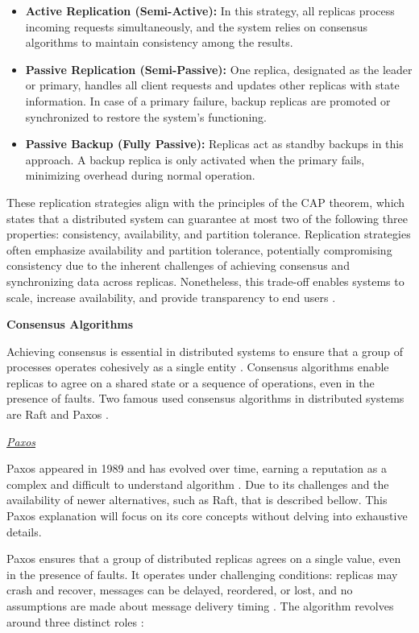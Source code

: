 \begin{itemize}
    \item	\textbf{Active Replication (Semi-Active):} In this strategy, all replicas process incoming requests simultaneously, and the system relies on consensus algorithms to maintain consistency among the results.
    \item	\textbf{Passive Replication (Semi-Passive):} One replica, designated as the leader or primary, handles all client requests and updates other replicas with state information. In case of a primary failure, backup replicas are promoted or synchronized to restore the system’s functioning.
    \item	\textbf{Passive Backup (Fully Passive):} Replicas act as standby backups in this approach. A backup replica is only activated when the primary fails, minimizing overhead during normal operation.
\end{itemize}

These replication strategies align with the principles of the CAP theorem, which states that a distributed system can guarantee at most two of the following three properties: consistency, availability, and partition tolerance. Replication strategies often emphasize availability and partition tolerance, potentially compromising consistency due to the inherent challenges of achieving consensus and synchronizing data across replicas. Nonetheless, this trade-off enables systems to scale, increase availability, and provide transparency to end users \cite{Kleppmann2017}.

\textbf{Consensus Algorithms}

Achieving consensus is essential in distributed systems to ensure that a group of processes operates cohesively as a single entity \cite{Tanenbaum2023}. Consensus algorithms enable replicas to agree on a shared state or a sequence of operations, even in the presence of faults. Two famous used consensus algorithms in distributed systems are Raft and Paxos \cite{Tanenbaum2023}.

\textit{\underline{Paxos}}

Paxos appeared in 1989 and has evolved over time, earning a reputation as a complex and difficult to understand algorithm \cite{Tanenbaum2023}. Due to its challenges and the availability of newer alternatives, such as Raft, that is described bellow. This Paxos explanation will focus on its core concepts without delving into exhaustive details.

Paxos ensures that a group of distributed replicas agrees on a single value, even in the presence of faults. It operates under challenging conditions: replicas may crash and recover, messages can be delayed, reordered, or lost, and no assumptions are made about message delivery timing \cite{Howard2020, Tanenbaum2023}. The algorithm revolves around three distinct roles \cite{Coulouris2012, Howard2020}:

